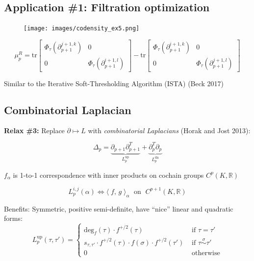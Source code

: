\documentclass[
  letterpaper,
  DIV=11,
  numbers=noendperiod,
  oneside]{scrartcl}
\begin{document}
\subsection{Application \#1: Filtration
optimization}\label{application-1-filtration-optimization-7}

\begin{figure}

{\centering \texttt{[image: images/codensity\_ex5.png]}

}

\end{figure}

\[ \mu_p^{R} = \mathrm{tr}\begin{bmatrix} \Phi_\tau(\partial_{p+1}^{j + 1, k}) & 0 \\
0 & \Phi_\tau(\partial_{p+1}^{i + 1, l})
\end{bmatrix}
- 
\mathrm{tr}\begin{bmatrix} \Phi_\tau(\partial_{p+1}^{i + 1, k}) & 0 \\
0 & \Phi_\tau(\partial_{p+1}^{j + 1, l})
\end{bmatrix}
\]

Similar to the Iterative Soft-Thresholding Algorithm (ISTA) (Beck 2017)

\subsection{Combinatorial Laplacian}\label{combinatorial-laplacian}

\textbf{Relax \#3:} Replace \(\partial \mapsto L\) with
\emph{combinatorial Laplacians} (Horak and Jost 2013):

\[ \Delta_p = \underbrace{\partial_{p+1} \partial_{p+1}^T}_{L_p^{\mathrm{up}}}  + \underbrace{\partial_{p}^T \partial_{p}}_{L_p^{\mathrm{dn}}} \]

\(f_\alpha\) is 1-to-1 correspondence with inner products on cochain
groups \(C^p(K, \mathbb{R})\)

\[L_p^{i,j}(\alpha) \Leftrightarrow \langle \; f,\, g \; \rangle_{\alpha} \; \text{ on } \;  C^{p+1}(K, \mathbb{R})\]

Benefits: Symmetric, positive semi-definite, have ``nice'' linear and
quadratic forms: \[
L_p^{\text{up}}(\tau, \tau')= \begin{cases}
         \mathrm{deg}_f(\tau) \cdot f^{+/2}(\tau) & \text{ if } \tau = \tau' \\ 
        s_{\tau, \tau'} \cdot  f^{+/2}(\tau) \cdot f(\sigma) \cdot f^{+/2}(\tau') & \text{ if } \tau \overset{\sigma}{\sim} \tau' \\
        0 & \text{ otherwise} 
    \end{cases}
\]
\end{document}
